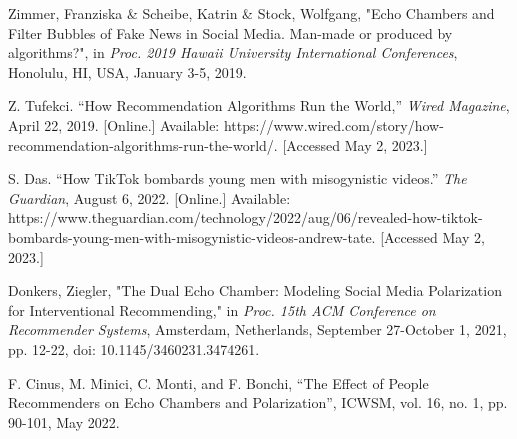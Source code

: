 \documentclass[10pt]{article}
\begin{document}
  

  \begin{thebibliography}{widest entry}
      Zimmer, Franziska & Scheibe, Katrin & Stock, Wolfgang, "Echo Chambers and Filter Bubbles of Fake News in Social Media. Man-made or produced by algorithms?", in \textit{Proc. 2019 Hawaii University International Conferences}, Honolulu, HI, USA, January 3-5, 2019. 

     Z. Tufekci. “How Recommendation Algorithms Run the World,” \textit{Wired Magazine}, April 22, 2019. [Online.] Available: https://www.wired.com/story/how-recommendation-algorithms-run-the-world/. [Accessed May 2, 2023.]

     S. Das. “How TikTok bombards young men with misogynistic videos.” \textit{The Guardian}, 
     August 6, 2022. [Online.] Available: https://www.theguardian.com/technology/2022/aug/06/revealed-how-tiktok-bombards-young-men-with-misogynistic-videos-andrew-tate. [Accessed May 2, 2023.]

    Donkers, Ziegler, "The Dual Echo Chamber: Modeling Social Media Polarization for Interventional Recommending," in \textit{Proc. 15th ACM Conference on Recommender Systems}, Amsterdam, Netherlands, September 27-October 1, 2021, pp. 12-22, doi: 10.1145/3460231.3474261. 
     
      F. Cinus, M. Minici, C. Monti, and F. Bonchi, “The Effect of People Recommenders on Echo Chambers and Polarization”, ICWSM, vol. 16, no. 1, pp. 90-101, May 2022.

    

     
    \end{thebibliography}
\end{document}
